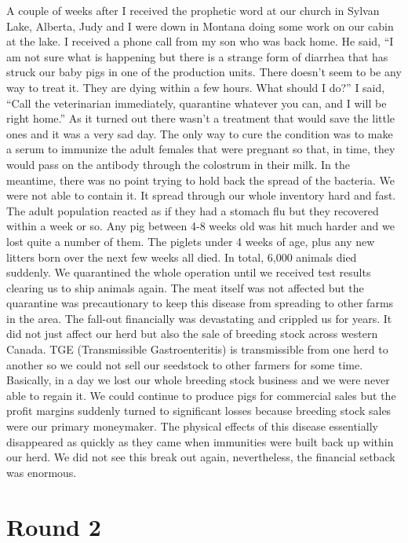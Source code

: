 \documentclass[twoside, 12pt]{book}
\begin{document}
A couple of weeks after I received the prophetic word at our church in Sylvan Lake, Alberta, Judy and I were down in Montana doing some work on our cabin at the lake. I received a phone call from my son who was back home. He said, “I am not sure what is happening but there is a strange form of diarrhea that has struck our baby pigs in one of the production units. There doesn’t seem to be any way to treat it. They are dying within a few hours. What should I do?” I said, “Call the veterinarian immediately, quarantine whatever you can, and I will be right home.” As it turned out there wasn’t a treatment that would save the little ones and it was a very sad day. The only way to cure the condition was to make a serum to immunize the adult females that were pregnant so that, in time, they would pass on the antibody through the colostrum in their milk. In the meantime, there was no point trying to hold back the spread of the bacteria. We were not able to contain it. It spread through our whole inventory hard and fast. The adult population reacted as if they had a stomach flu but they recovered within a week or so. Any pig between 4-8 weeks old was hit much harder and we lost quite a number of them. The piglets under 4 weeks of age, plus any new litters born over the next few weeks all died. In total, 6,000 animals died suddenly. We quarantined the whole operation until we received test results clearing us to ship animals again. The meat itself was not affected but the quarantine was precautionary to keep this disease from spreading to other farms in the area. The fall-out financially was devastating and crippled us for years. It did not just affect our herd but also the sale of breeding stock across western Canada. TGE (Transmissible Gastroenteritis) is transmissible from one herd to another so we could not sell our seedstock to other farmers for some time. Basically, in a day we lost our whole breeding stock business and we were never able to regain it. We could continue to produce pigs for commercial sales but the profit margins suddenly turned to significant losses because breeding stock sales were our primary moneymaker. The physical effects of this disease essentially disappeared as quickly as they came when immunities were built back up within our herd. We did not see this break out again, nevertheless, the financial setback was enormous.


\section{Round 2}
\
\end{document}
